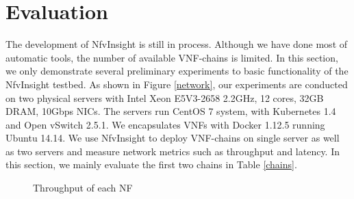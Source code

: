 \section{Evaluation}
The development of NfvInsight is still in process.
Although we have done most of automatic tools, the number of
available VNF-chains is limited. In this section, we only
demonstrate several preliminary experiments to basic functionality
of the NfvInsight testbed. As shown in Figure \ref{network},
our experiments are conducted on two
physical servers with Intel Xeon E5V3-2658 2.2GHz,
12 cores, 32GB DRAM, 10Gbps NICs. The servers run
CentOS 7 system, with Kubernetes 1.4 and Open vSwitch 2.5.1.
We encapsulates VNFs with Docker 1.12.5 running Ubuntu 14.14.
We use NfvInsight to deploy VNF-chains on single server
as well as two servers and measure network metrics
such as throughput and latency.
In this section, we mainly evaluate the first two chains in Table \ref{chains}.





%

\begin{figure}[!t]
\centering
{}
\hfil
{}
\hfil
\caption{Throughput of each NF}
\label{throughput}
\end{figure}



